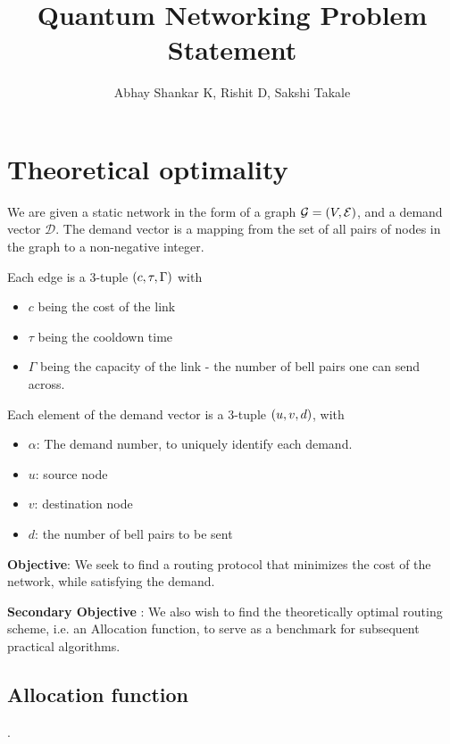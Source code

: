 \documentclass{amsart}
\begin{document}
    \title{Quantum Networking Problem Statement}
    \author{Abhay Shankar K, Rishit D, Sakshi Takale}
    \maketitle

    \section{Theoretical optimality}

    We are given a static network in the form of a graph \(\mathcal{G} = \left(V, \mathcal{E}\right)\), and a demand vector \(\mathcal{D}\). The demand vector is a mapping from the set of all pairs of nodes in the graph to a non-negative integer. 

    Each edge is a 3-tuple \(\left(c, \tau, \Gamma\right)\) with \begin{itemize}
        \item \(c\) being the cost of the link
        \item \(\tau\) being the cooldown time
        \item \(\Gamma\) being the capacity of the link - the number of bell pairs one can send across.
    \end{itemize}

    Each element of the demand vector is a 3-tuple \(\left(u, v, d\right)\), with \begin{itemize}
        \item \(\alpha\): The demand number, to uniquely identify each demand.
        \item \(u\): source node
        \item \(v\): destination node
        \item \(d\): the number of bell pairs to be sent
    \end{itemize}

    \textbf{Objective}:
    We seek to find a routing protocol that minimizes the cost of the network, while satisfying the demand. 

    \textbf{Secondary Objective} : We also wish to find the theoretically optimal routing scheme, i.e. an Allocation function, to serve as a benchmark for subsequent practical algorithms.
    
    \subsection{Allocation function}.
\end{document}
